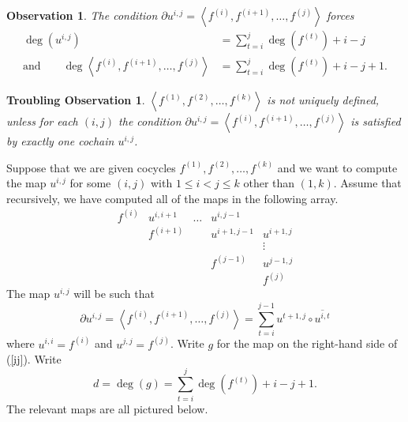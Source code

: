 \documentclass[12pt]{article}
\newtheorem{observation}[definition]{Observation}
\newtheorem{trouble}[definition]{Troubling Observation}
\begin{document}
\begin{observation}\label{degree}
The  condition $\partial u^{i,j}
=\left\langle f^{\left(i\right)},
f^{\left(i+1\right)},\dots,f^{\left(j\right)}\right\rangle$ forces
\begin{align*}
\deg\left(u^{i,j}\right)
&=\sum_{t=i}^j \deg\left(f^{\left(t\right)}\right) +i-j\\
\text{and}\qquad\deg\left\langle f^{\left(i\right)},
f^{\left(i+1\right)},\dots,f^{\left(j\right)}\right\rangle
&=\sum_{t=i}^j \deg\left(f^{\left(t\right)}\right) +i-j+1.
\end{align*}
\end{observation}

\begin{trouble}
$\left\langle f^{\left(1\right)},
f^{\left(2\right)},\dots,f^{\left(k\right)}\right\rangle$
is not uniquely defined, unless for each $\left(i,j\right)$
the condition
$\partial u^{i,j}=\left\langle f^{\left(i\right)},
f^{\left(i+1\right)},\dots,f^{\left(j\right)}\right\rangle$
is satisfied by exactly one cochain $u^{i,j}$.
\end{trouble}

Suppose that we are given cocycles
$f^{\left(1\right)}, f^{\left(2\right)},\dots,f^{\left(k\right)}$
and we want to compute the 
map $u^{i,j}$ for some $\left(i,j\right)$
with $1\le i<j\le k$ other than $\left(1,k\right)$.
Assume that recursively,
we have computed all of the maps in the following array.
\[\begin{array}{ccccc}
f^{\left(i\right)}&u^{i,i+1}
&\dots&u^{i,j-1}&\\
&f^{\left(i+1\right)}&&u^{i+1,j-1}
&u^{i+1,j}\\
&&&&\vdots\\
&&&f^{\left(j-1\right)}&u^{j-1,j}\\
&&&&f^{\left(j\right)}
\end{array}\]
The map $u^{i,j}$ will be such that
\begin{equation}\label{ij}
\partial u^{i,j}=
\left\langle f^{\left(i\right)}, f^{\left(i+1\right)},\dots, 
f^{\left(j\right)}\right\rangle
=\sum_{t=i}^{j-1}
u^{t+1,j}\circ
\overline{u^{i,t}}
\end{equation}
where $u^{i,i}=f^{\left(i\right)}$
and $u^{j,j}=f^{\left(j\right)}$.
Write $g$ for the map on the right-hand side
of (\ref{ij}).
Write \[d=\deg\left(g\right)
=\sum_{t=i}^j\deg\left(f^{\left(t\right)}\right)+i-j+1.\]
The relevant maps are all pictured below.
\end{document}
